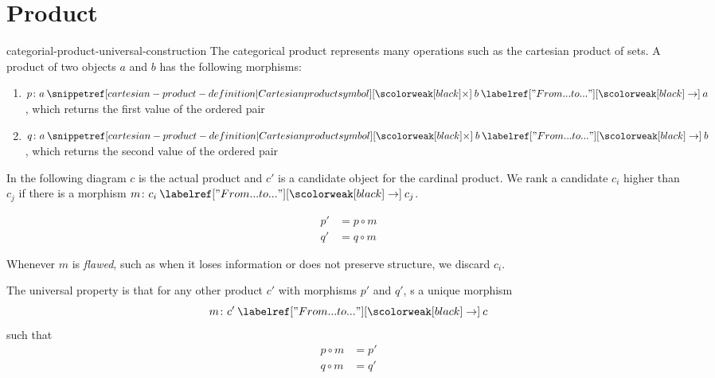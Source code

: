 \documentclass[preview]{standalone}
\begin{document}
\section{Product}

\begin{snippet}{categorial-product-universal-construction}
The categorical product represents many operations
such as the cartesian product of sets.
A product of two objects \(a\) and \(b\) has the following
morphisms:
\begin{enumerate}
    \item \(p \colon a \cartesianprod b \fromto a\), which returns the first value of the ordered pair
    \item \(q \colon a \cartesianprod b \fromto b\), which returns the second value of the ordered pair
\end{enumerate}

In the following diagram \(c\) is the actual product and \(c'\) is a candidate object
for the cardinal product.
We rank a candidate \(c_i\) higher than \(c_j\) if there is a morphism
\(m \colon c_i \fromto c_j\).

\begin{minipage}{0.5\textwidth}
\end{minipage}
\begin{minipage}{0.5\textwidth}
    \begin{align*}
        p' &= p \circ m \\
        q' &= q \circ m 
    \end{align*}
\end{minipage}

Whenever \(m\) is \textit{flawed}, such as when it loses information
or does not preserve structure, we discard \(c_i\).

The universal property is that for any other product
\(c'\) with morphisms \(p'\) and \(q'\),
s a unique morphism
\[
    m \colon c'\fromto c
\]
such that
\begin{align*}
    p \circ m &= p' \\
    q \circ m &= q'
\end{align*}
\end{snippet}
\end{document}
